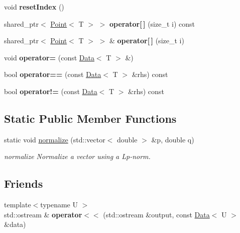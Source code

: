 \begin{DoxyCompactItemize}
\mbox{\label{class_data_aae060f1a0ce3448b8e9b9f63d9ee4bbc}} 
void {\bfseries reset\+Index} ()
\item 
\mbox{\label{class_data_a648cf5e0c60535f619afba52da6ad67a}} 
shared\+\_\+ptr$<$ \hyperlink{class_point}{Point}$<$ T $>$ $>$ {\bfseries operator\mbox{[}$\,$\mbox{]}} (size\+\_\+t i) const
\item 
\mbox{\label{class_data_a5fc899679b391fabdef42db15136a375}} 
shared\+\_\+ptr$<$ \hyperlink{class_point}{Point}$<$ T $>$ $>$ \& {\bfseries operator\mbox{[}$\,$\mbox{]}} (size\+\_\+t i)
\item 
\mbox{\label{class_data_a108d2986a26cfe07f7a4ee5a2e8e1c9b}} 
void {\bfseries operator=} (const \hyperlink{class_data}{Data}$<$ T $>$ \&)
\item 
\mbox{\label{class_data_a67b4eb14ee534c26b115e35ac9537baa}} 
bool {\bfseries operator==} (const \hyperlink{class_data}{Data}$<$ T $>$ \&rhs) const
\item 
\mbox{\label{class_data_a36bc3fedaadbe06283b6796018381e2c}} 
bool {\bfseries operator!=} (const \hyperlink{class_data}{Data}$<$ T $>$ \&rhs) const
\end{DoxyCompactItemize}
\subsection*{Static Public Member Functions}
\begin{DoxyCompactItemize}
\item 
static void \hyperlink{class_data_ad5c41d33e1de7531b952d6f33b7eca90}{normalize} (std\+::vector$<$ double $>$ \&p, double q)
\begin{DoxyCompactList}\small\item\em normalize Normalize a vector using a Lp-\/norm. \end{DoxyCompactList}\end{DoxyCompactItemize}
\subsection*{Friends}
\begin{DoxyCompactItemize}
\item 
\mbox{\label{class_data_a6e0fbda87f04e3f9960f8f2a818e2f9d}} 
{\footnotesize template$<$typename U $>$ }\\std\+::ostream \& {\bfseries operator$<$$<$} (std\+::ostream \&output, const \hyperlink{class_data}{Data}$<$ U $>$ \&data)
\end{DoxyCompactItemize}



